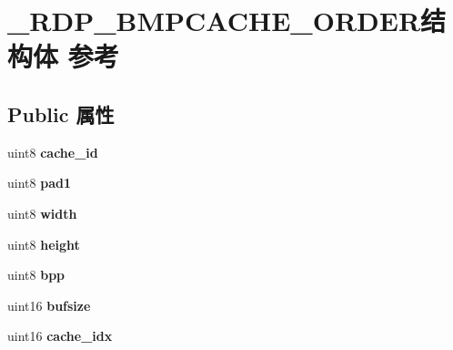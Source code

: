 \hypertarget{struct___r_d_p___b_m_p_c_a_c_h_e___o_r_d_e_r}{}\section{\+\_\+\+R\+D\+P\+\_\+\+B\+M\+P\+C\+A\+C\+H\+E\+\_\+\+O\+R\+D\+E\+R结构体 参考}
\label{struct___r_d_p___b_m_p_c_a_c_h_e___o_r_d_e_r}
\subsection*{Public 属性}
\begin{DoxyCompactItemize}
\item 
\mbox{\label{struct___r_d_p___b_m_p_c_a_c_h_e___o_r_d_e_r_aa5fb32cd267d8d7dfbe8deed21fca36a}} 
uint8 {\bfseries cache\+\_\+id}
\item 
\mbox{\label{struct___r_d_p___b_m_p_c_a_c_h_e___o_r_d_e_r_acaf5e0163a1ff8d98efe9c1f6ba0ff5c}} 
uint8 {\bfseries pad1}
\item 
\mbox{\label{struct___r_d_p___b_m_p_c_a_c_h_e___o_r_d_e_r_a69cd4b1ec58cc816d701676c73156a46}} 
uint8 {\bfseries width}
\item 
\mbox{\label{struct___r_d_p___b_m_p_c_a_c_h_e___o_r_d_e_r_a207ef77da742ec4f305096ab4be8395f}} 
uint8 {\bfseries height}
\item 
\mbox{\label{struct___r_d_p___b_m_p_c_a_c_h_e___o_r_d_e_r_a14475272856c125414bd7906704b971e}} 
uint8 {\bfseries bpp}
\item 
\mbox{\label{struct___r_d_p___b_m_p_c_a_c_h_e___o_r_d_e_r_a02fceedd0f70bb8b6bcd5300610c2ef8}} 
uint16 {\bfseries bufsize}
\item 
\mbox{\label{struct___r_d_p___b_m_p_c_a_c_h_e___o_r_d_e_r_acc2f84e4ddbbc8a52caec14381ebea17}} 
uint16 {\bfseries cache\+\_\+idx}
\item 

\end{DoxyCompactItemize}
